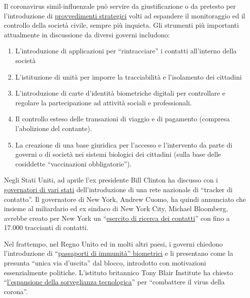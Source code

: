 Il coronavirus simil-influenzale può servire da giustificazione o da
pretesto per l'introduzione di
\href{https://norberthaering.de/die-regenten-der-welt/id2020-ktdi-apple-google/}{provvedimenti
strategici} volti ad espandere il monitoraggio ed il controllo della
società civile, sempre più inquieta. Gli strumenti più importanti
attualmente in discussione da diversi governi includono:

\begin{enumerate}
\def\labelenumi{\arabic{enumi}.}
\tightlist
\item
  L'introduzione di applicazioni per ``rintracciare'' i contatti
  all'interno della società
\item
  L'istituzione di unità per imporre la tracciabilità e l'isolamento dei
  cittadini
\item
  L'introduzione di carte d'identità biometriche digitali per
  controllare e regolare la partecipazione ad attività sociali e
  professionali.
\item
  Il controllo esteso delle transazioni di viaggio e di pagamento
  (compresa l'abolizione del contante).
\item
  La creazione di una base giuridica per l'accesso e l'intervento da
  parte di governi o di società nei sistemi biologici dei cittadini
  (sulla base delle cosiddette ``vaccinazioni obbligatorie'').
\end{enumerate}

Negli Stati Uniti, ad aprile l'ex presidente Bill Clinton ha discusso
con i \href{https://www.youtube.com/watch?v=-Ug9XHT9JQQ}{governatori di
vari stati} dell'introduzione di una rete nazionale di ``tracker di
contatto''. Il governatore di New York, Andrew Cuomo, ha quindi
annunciato che insieme al miliardario ed ex sindaco di New York City,
Michael Bloomberg, avrebbe creato per New York un
``\href{https://www.cbsnews.com/news/contact-tracing-new-york-cuomo-plan/}{esercito
di ricerca dei contatti}'' con fino a 17.000 traccianti di contatti.

Nel frattempo, nel Regno Unito ed in molti altri paesi, i governi
chiedono l'introduzione di
``\href{https://www.msn.com/en-us/money/news/the-uk-just-published-blueprints-for-covid-19-immunity-passports-a-controversial-potential-route-out-of-lockdown/ar-BB13qr8L}{passaporti
di immunità'' biometrici} e li presentano come la presunta ``unica via
d'uscita'' dal blocco, introdotto con motivazioni essenzialmente
politiche. L'istituto britannico Tony Blair Institute ha chiesto
``\href{https://www.theguardian.com/world/2020/apr/24/surveillance-a-price-worth-paying-to-beat-coronavirus-says-blair-thinktank}{l'espansione
della sorveglianza tecnologica}'' per ``combattere il virus della
corona''.

